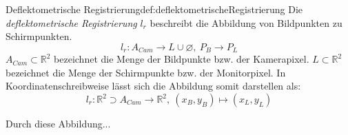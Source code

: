 \begin{Definition}{Deflektometrische Registrierung}{def:deflektometrischeRegistrierung}
	Die \textit{deflektometrische Registrierung} $ l_{r} $ beschreibt die Abbildung von Bildpunkten zu Schirmpunkten. \cite{kit_sbw}
	\begin{equation}
		l_{r} : A_{Cam} \rightarrow L \cup \varnothing ,~ P_{B} \rightarrow P_{L}
	\end{equation}
	$ A_{Cam} \subset \mathbb{R}^{2} $ bezeichnet die Menge der Bildpunkte bzw. der Kamerapixel.
	$ L \subset \mathbb{R}^{2} $ bezeichnet die Menge der Schirmpunkte bzw. der Monitorpixel.
	In Koordinatenschreibweise lässt sich die Abbildung somit darstellen als:
	\begin{equation} \label{eq:deflektometrischeRegistrierung}
		l_{r} : \mathbb{R}^{2} \supset A_{Cam} \rightarrow \mathbb{R}^2 ,~ (x_{B}, y_{B}) \mapsto  (x_{L}, y_{L})
	\end{equation}
\end{Definition}

\noindent
Durch diese Abbildung...